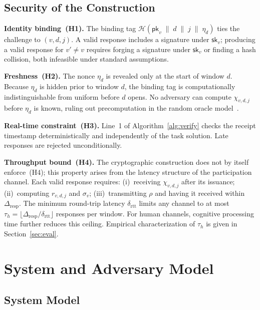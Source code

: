 \documentclass[11pt]{article}
\theoremstyle{remark}
\theoremstyle{plain}
\begin{document}
	\subsection{Security of the Construction}
	
	\noindent\textbf{Identity binding~(H1).}
	The binding tag $\mathcal{H}(\mathsf{pk}_v \;\|\; d \;\|\; j \;\|\; \eta_d)$
	ties the challenge to $(v,d,j)$. A valid response includes a signature
	under $\mathsf{sk}_v$; producing a valid response for $v' \neq v$ requires
	forging a signature under $\mathsf{sk}_v$ or finding a hash collision, both
	infeasible under standard assumptions.
	
	\noindent\textbf{Freshness~(H2).}
	The nonce $\eta_d$ is revealed only at the start of window $d$.
	Because $\eta_d$ is hidden prior to window $d$, the binding tag is
	computationally indistinguishable from uniform before $d$ opens. No
	adversary can compute $\chi_{v,d,j}$ before $\eta_d$ is known,
	ruling out precomputation in the random oracle model~\cite{bellare1993random}.
	
	\noindent\textbf{Real-time constraint~(H3).}
	Line~1 of Algorithm~\ref{alg:verify} checks the receipt timestamp
	deterministically and independently of the task solution. Late responses
	are rejected unconditionally.
	
	\noindent\textbf{Throughput bound~(H4).}
	The cryptographic construction does not by itself enforce~(H4); this
	property arises from the latency structure of the participation channel.
	Each valid response requires: (i)~receiving $\chi_{v,d,j}$ after its
	issuance; (ii)~computing $r_{v,d,j}$ and $\sigma_v$; (iii)~transmitting
	$\rho$ and having it received within $\Delta_{\mathrm{resp}}$. The minimum
	round-trip latency $\delta_{\mathrm{rtt}}$ limits any channel to at most
	$\tau_h = \lfloor \Delta_{\mathrm{resp}} / \delta_{\mathrm{rtt}} \rfloor$
	responses per window. For human channels, cognitive processing time further
	reduces this ceiling. Empirical characterization of $\tau_h$ is given
	in Section~\ref{sec:eval}.
	
	
	\section{System and Adversary Model}
	\label{sec:model}
	
	\subsection{System Model}
	
\end{document}
